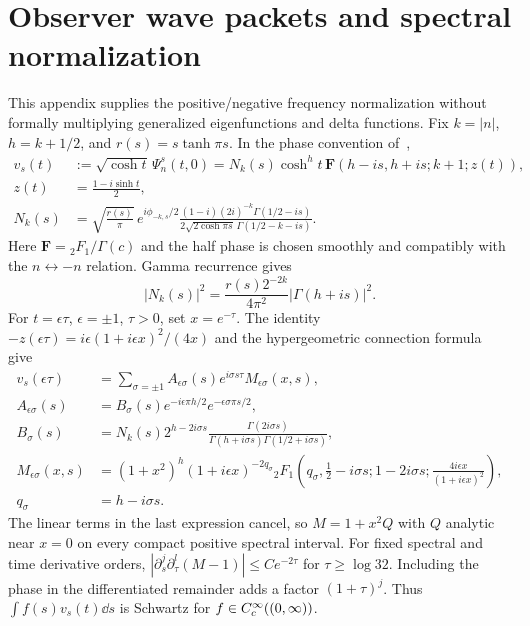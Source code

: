 \section{Observer wave packets and spectral normalization}
\label{app:normalization}
This appendix supplies the positive/negative frequency normalization without
formally multiplying generalized eigenfunctions and delta functions.
Fix $k=|n|$, $h=k+1/2$, and $r(s)=s\tanh\pi s$. In the phase convention
of~\cite[(3.11), (4.9), (A.5)--(A.6)]{KL},
\begin{align}
 v_s(t)&:=\sqrt{\cosh t}\,\Psi_n^s(t,0)
 =N_k(s)\cosh^h t\,
 \mathbf F(h-is,h+is;k+1;z(t)),\\
 z(t)&=\frac{1-i\sinh t}{2},\\
 N_k(s)&=\sqrt{\frac{r(s)}{\pi}}\,
 e^{i\phi_{-k,s}/2}
 \frac{(1-i)(2i)^{-k}\Gamma(1/2-is)}
      {2\sqrt{2\cosh\pi s}\,\Gamma(1/2-k-is)}.
\end{align}
Here $\mathbf F={}_2F_1/\Gamma(c)$ and the half phase is chosen smoothly
and compatibly with the $n\leftrightarrow-n$ relation. Gamma recurrence
gives
\begin{equation}
 |N_k(s)|^2=\frac{r(s)2^{-2k}}{4\pi^2}
                         |\Gamma(h+is)|^2.
\end{equation}
For $t=\epsilon\tau$, $\epsilon=\pm1$, $\tau>0$, set $x=e^{-\tau}$.
The identity $-z(\epsilon\tau)=i\epsilon(1+i\epsilon x)^2/(4x)$ and
the hypergeometric connection formula~\cite[15.8.2]{DLMF} give
\begin{align}
 v_s(\epsilon\tau)&=\sum_{\sigma=\pm1}
       A_{\epsilon\sigma}(s)e^{i\sigma s\tau}
       M_{\epsilon\sigma}(x,s),\\
 A_{\epsilon\sigma}(s)&=B_\sigma(s)
          e^{-i\epsilon\pi h/2}e^{-\epsilon\sigma\pi s/2},\\
 B_\sigma(s)&=
 N_k(s)2^{h-2i\sigma s}
 \frac{\Gamma(2i\sigma s)}
      {\Gamma(h+i\sigma s)\Gamma(1/2+i\sigma s)},\\
 M_{\epsilon\sigma}(x,s)&=(1+x^2)^h
 (1+i\epsilon x)^{-2q_\sigma}
 {}_2F_1\left(q_\sigma,\tfrac12-i\sigma s;1-2i\sigma s;
       \frac{4i\epsilon x}{(1+i\epsilon x)^2}\right),\\
 q_\sigma&=h-i\sigma s.
\end{align}
The linear terms in the last expression cancel, so $M=1+x^2Q$ with
$Q$ analytic near $x=0$ on every compact positive spectral interval.
For fixed spectral and time derivative orders,
$|\partial_s^j\partial_\tau^l(M-1)|\le Ce^{-2\tau}$ for
$\tau\ge\log32$. Including the phase in the differentiated remainder
adds a factor $(1+\tau)^j$.
Thus $\int f(s)v_s(t)\dd s$ is Schwartz for $f\in C_c^\infty((0,\infty))$.

